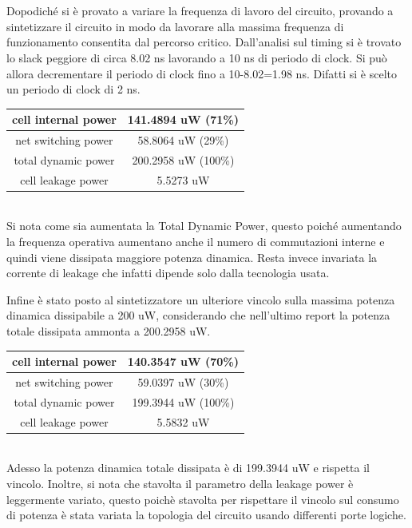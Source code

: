\\
\\
\\
\\
\\
\\
\\
Dopodiché si è provato a variare la frequenza di lavoro del circuito, provando a sintetizzare il circuito in modo da lavorare alla massima frequenza di funzionamento consentita dal percorso critico. Dall’analisi sul timing si è trovato lo slack peggiore di circa 8.02 ns  lavorando a 10 ns di periodo di clock. Si può allora decrementare il periodo di clock fino a 10-8.02=1.98 ns. Difatti si è scelto un periodo di clock di 2 ns.
\\
\begin{table}[!h]\footnotesize
	\centering
	\begin{tabular}{|c|c|}
		\hline
		cell internal power & 141.4894 uW (71\%)\\
		\hline
		net switching power & 58.8064 uW (29\%)\\
		\hline
		\hline
		total dynamic power & 200.2958 uW (100\%)\\
		\hline
		cell leakage power & 5.5273 uW\\
		\hline
	\end{tabular}
\end{table} \\
 Si nota come sia aumentata la Total Dynamic Power, questo poiché aumentando la frequenza operativa aumentano anche il numero di commutazioni interne e quindi viene dissipata maggiore potenza dinamica. Resta invece invariata la corrente di leakage che infatti dipende solo dalla tecnologia usata.

Infine è stato posto al sintetizzatore un ulteriore vincolo sulla massima potenza dinamica dissipabile a 200 uW, considerando che nell’ultimo report la potenza totale dissipata ammonta a 200.2958 uW.
\\
\begin{table}[!h]\footnotesize
	\centering
	\begin{tabular}{|c|c|}
		\hline
		cell internal power & 140.3547 uW (70\%)\\
		\hline
		net switching power & 59.0397 uW (30\%)\\
		\hline
		\hline
		total dynamic power & 199.3944 uW (100\%)\\
		\hline
		cell leakage power & 5.5832 uW\\
		\hline
	\end{tabular}
\end{table} \\
Adesso la potenza dinamica totale dissipata è di 199.3944 uW e rispetta il vincolo.
Inoltre, si nota che stavolta il parametro della leakage power è leggermente variato, questo poichè stavolta per rispettare il vincolo sul consumo di potenza è stata variata la topologia del circuito usando differenti porte logiche.
\\

